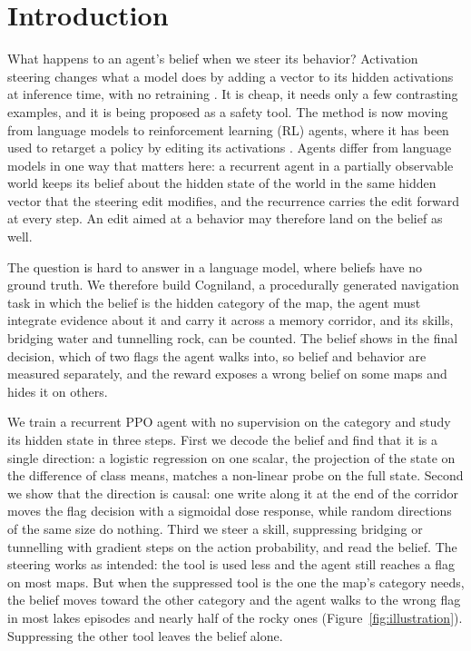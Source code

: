 \section{Introduction}
What happens to an agent's belief when we steer its behavior? Activation
steering changes what a model does by adding a vector to its hidden
activations at inference time, with no retraining
\citep{turner2023actadd,rimsky2024caa,zou2023repe}. It is cheap, it needs only
a few contrasting examples, and it is being proposed as a safety tool. The
method is now moving from language models to reinforcement learning (RL)
agents, where it has been used to retarget a policy by editing its activations
\citep{mini2023maze}. Agents differ from language models in one way that
matters here: a recurrent agent in a partially observable world keeps its
belief about the hidden state of the world in the same hidden vector that the
steering edit modifies, and the recurrence carries the edit forward at every
step. An edit aimed at a behavior may therefore land on the belief as well.

The question is hard to answer in a language model, where beliefs have no
ground truth. We therefore build Cogniland, a procedurally generated navigation task
in which the belief is the hidden category of the map, the agent must
integrate evidence about it and carry it across a memory corridor, and its
skills, bridging water and tunnelling rock, can be counted. The belief shows
in the final decision, which of two flags the agent walks into, so belief and
behavior are measured separately, and the reward exposes a wrong belief on
some maps and hides it on others.

We train a recurrent PPO agent with no supervision on the category and study
its hidden state in three steps. First we decode the belief and find that it
is a single direction: a logistic regression on one scalar, the projection of
the state on the difference of class means, matches a non-linear probe on the
full state. Second we show that the direction is causal: one write along it
at the end of the corridor moves the flag decision with a sigmoidal dose
response, while random directions of the same size do nothing. Third we steer
a skill, suppressing bridging or tunnelling with gradient steps on the action
probability, and read the belief. The steering works as intended: the tool is
used less and the agent still reaches a flag on most maps. But when the
suppressed tool is the one the map's category needs, the belief moves toward
the other category and the agent walks to the wrong flag in most lakes
episodes and nearly half of the rocky ones (Figure~\ref{fig:illustration}).
Suppressing the other tool leaves the belief alone.

